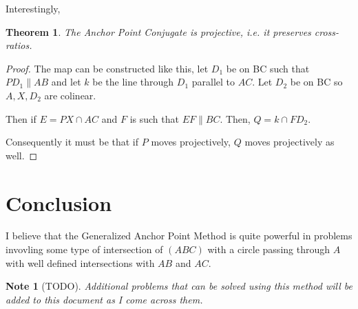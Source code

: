 \documentclass{article}
\newtheorem{theorem}{Theorem}
\newtheorem{note}{Note}
\begin{document}
Interestingly,
\begin{theorem}
  The \textit{Anchor Point Conjugate} is projective, i.e. it preserves cross-ratios.
\end{theorem}
\begin{proof}
  The map can be constructed like this, let \(D_1\) be on BC such that \(PD_1 \parallel AB\) and let \(k\) be the line through \(D_1\) parallel to \(AC\). Let \(D_2\) be on BC so \(A,X,D_2\) are colinear.

  Then if \(E = PX \cap AC\) and \(F\) is such that \(EF \parallel BC\). Then, \(Q = k \cap FD_2\).

  Consequently it must be that if \(P\) moves projectively, \(Q\) moves projectively as well.
\end{proof}

\section{Conclusion}

I believe that the Generalized Anchor Point Method is quite powerful in problems invovling some type of intersection of \((ABC)\) with a circle passing through \(A\) with well defined intersections with \(AB\) and \(AC\).

\begin{note}[TODO]
  Additional problems that can be solved using this method will be added to this document as I come across them.
\end{note}
\end{document}
